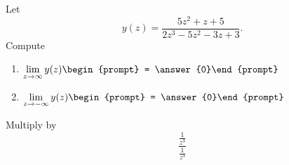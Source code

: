 \documentclass[handout]{ximera}
\begin{document}
\begin{exercise}
Let 
\[
y(z) = \frac{5 z^2+z+5}{2 z^3-5 z^2-3 z+3}.
\]
Compute
\begin{enumerate}
\item $\displaystyle\lim_{z\to \infty} y(z) \begin{prompt} = \answer{0}\end{prompt}$
\item $\displaystyle\lim_{z\to -\infty}y(z) \begin{prompt} = \answer{0}\end{prompt}$
\end{enumerate}
\begin{hint}
Multiply by
\[
\frac{\frac{1}{z^3}}{\frac{1}{z^3}}
\]
\end{hint}
\end{exercise}
\end{document}
